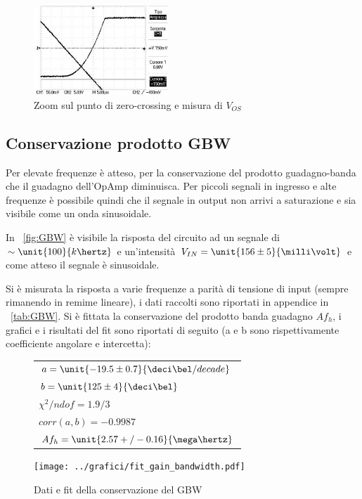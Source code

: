 \documentclass[10pt,a4paper]{article}
\begin{document}
\begin{figure}[H]
	\centering
	\includegraphics[width=0.45\textwidth]{../oscilloscopio/Vos.jpg}
	\caption{Zoom sul punto di zero-crossing e misura di $V_{OS}$}
	\label{fig:vos}
\end{figure}

\subsection{Conservazione prodotto GBW}
Per elevate frequenze è atteso, per la conservazione del prodotto guadagno-banda che il guadagno dell'OpAmp diminuisca. Per piccoli segnali in ingresso e alte frequenze è possibile quindi che il segnale in output non arrivi a saturazione e sia visibile come un onda sinusoidale.

In \figurename{~\ref{fig:GBW}} è visibile la risposta del circuito ad un segnale di $\sim\unit{100}{k\hertz}$ e un'intensità $V_{IN}= \unit{156 \pm 5}{\milli\volt}$ e come atteso il segnale è sinusoidale.

Si è misurata la risposta a varie frequenze a parità di tensione di input (sempre rimanendo in remime lineare), i dati raccolti sono riportati in appendice in \tablename{~\ref{tab:GBW}}. Si è fittata la conservazione del prodotto banda guadagno $Af_h$, i grafici e i risultati del fit sono riportati di seguito (a e b sono rispettivamente coefficiente angolare e intercetta):

\begin{figure}[H]
	\begin{minipage}{0.28\textwidth}
		\centering
		\begin{tabular}{l}
			$a = \unit{-19.5 \pm 0.7}{\deci\bel / decade}$ \\
			$b = \unit{125 \pm 4}{\deci \bel}$ \\
			$\chi^2 / ndof = 1.9/3$\\
			$corr(a,b) = -0.9987$\\
			$Af_h = \unit{2.57+/-0.16}{\mega\hertz}$
		\end{tabular}
	\end{minipage}
	\begin{minipage}{0.75\textwidth}
		\centering
		\texttt{[image: ../grafici/fit\_gain\_bandwidth.pdf]}
		\caption{Dati e fit della conservazione del GBW}
		\label{}
	\end{minipage}
\end{figure}
\end{document}
